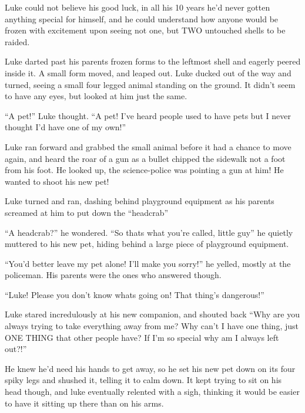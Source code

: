 Luke could not believe his good luck, in all his 10 years he'd
never gotten anything special for himself, and he could understand
how anyone would be frozen with excitement upon seeing not one, but
TWO untouched shells to be raided.



Luke darted past his parents frozen forms to the leftmost shell and
eagerly peered inside it. A small form moved, and leaped out. Luke
ducked out of the way and turned, seeing a small four legged animal
standing on the ground. It didn't seem to have any eyes, but looked
at him just the same.



``A pet!'' Luke thought. ``A pet! I've heard people used to have pets
but I never thought I'd have one of my own!''



Luke ran forward and grabbed the small animal before it had a
chance to move again, and heard the roar of a gun as a bullet
chipped the sidewalk not a foot from his foot. He looked up, the
science-police was pointing a gun at him! He wanted to shoot his
new pet!



Luke turned and ran, dashing behind playground equipment as his
parents screamed at him to put down the ``headcrab''



``A headcrab?'' he wondered. ``So thats what you're called, little
guy'' he quietly muttered to his new pet, hiding behind a large
piece of playground equipment.



``You'd better leave my pet alone! I'll make you sorry!'' he yelled,
mostly at the policeman. His parents were the ones who answered
though.



``Luke! Please you don't know whats going on! That thing's
dangerous!''



Luke stared incredulously at his new companion, and shouted back
``Why are you always trying to take everything away from me? Why
can't I have one thing, just ONE THING that other people have? If
I'm so special why am I always left out?!''



He knew he'd need his hands to get away, so he set his new pet down
on its four spiky legs and shushed it, telling it to calm down. It
kept trying to sit on his head though, and luke eventually relented
with a sigh, thinking it would be easier to have it sitting up
there than on his arms.



